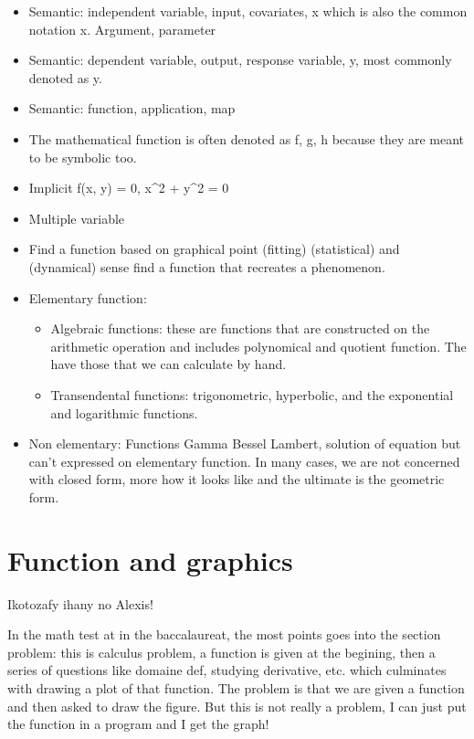 \documentclass[
  letterpaper,
  DIV=11,
  numbers=noendperiod]{scrreprt}
\providecommand{\tightlist}{%
  \setlength{\itemsep}{0pt}\setlength{\parskip}{0pt}}
\begin{document}
\begin{itemize}
\item
  Semantic: independent variable, input, covariates, x which is also the
  common notation x. Argument, parameter
\item
  Semantic: dependent variable, output, response variable, y, most
  commonly denoted as y.
\item
  Semantic: function, application, map
\item
  The mathematical function is often denoted as f, g, h because they are
  meant to be symbolic too.
\item
  Implicit f(x, y) = 0, x\^{}2 + y\^{}2 = 0
\item
  Multiple variable
\item
  Find a function based on graphical point (fitting) (statistical) and
  (dynamical) sense find a function that recreates a phenomenon.
\item
  Elementary function:

  \begin{itemize}
  \tightlist
  \item
    Algebraic functions: these are functions that are constructed on the
    arithmetic operation and includes polynomical and quotient function.
    The have those that we can calculate by hand.
  \item
    Transendental functions: trigonometric, hyperbolic, and the
    exponential and logarithmic functions.
  \end{itemize}
\item
  Non elementary: Functions Gamma Bessel Lambert, solution of equation
  but can't expressed on elementary function. In many cases, we are not
  concerned with closed form, more how it looks like and the ultimate is
  the geometric form.
\end{itemize}

\chapter{Function and graphics}\label{sec-functionViz}

Ikotozafy ihany no Alexis!

In the math test at in the baccalaureat, the most points goes into the
section problem: this is calculus problem, a function is given at the
begining, then a series of questions like domaine def, studying
derivative, etc. which culminates with drawing a plot of that function.
The problem is that we are given a function and then asked to draw the
figure. But this is not really a problem, I can just put the function in
a program and I get the graph!
\end{document}
